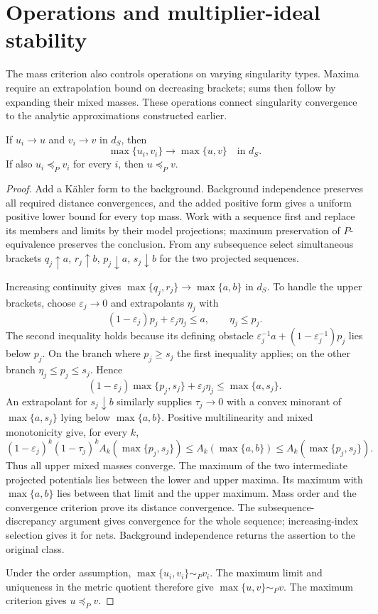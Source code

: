 \section{Operations and multiplier-ideal stability}
\label{sec:singularity-continuous-operations}
The mass criterion also controls operations on varying singularity types. Maxima require an extrapolation bound on decreasing brackets; sums then follow by expanding their mixed masses. These operations connect singularity convergence to the analytic approximations constructed earlier.

\begin{proposition}\label{prop:singularity-maximum-and-closed-order}
If $u_i\to u$ and $v_i\to v$ in $d_S$, then
\[
 \max\{u_i,v_i\}\longrightarrow\max\{u,v\}\quad\text{in }d_S.
\]
If also $u_i\preceq_P v_i$ for every $i$, then $u\preceq_P v$.
\end{proposition}
\begin{proof}
Add a K\"ahler form to the background. Background independence preserves all required distance convergences, and the added positive form gives a uniform positive lower bound for every top mass. Work with a sequence first and replace its members and limits by their model projections; maximum preservation of $P$-equivalence preserves the conclusion. From any subsequence select simultaneous brackets
$q_j\uparrow a$, $r_j\uparrow b$, $p_j\downarrow a$, $s_j\downarrow b$ for the two projected sequences.

Increasing continuity gives $\max\{q_j,r_j\}\to\max\{a,b\}$ in $d_S$. To handle the upper brackets, choose $\varepsilon_j\to0$ and extrapolants $\eta_j$ with
\[
 (1-\varepsilon_j)p_j+\varepsilon_j\eta_j\leq a,
                           \qquad\eta_j\leq p_j.
\]
The second inequality holds because its defining obstacle
$\varepsilon_j^{-1}a+(1-\varepsilon_j^{-1})p_j$ lies below $p_j$. On the branch where $p_j\geq s_j$ the first inequality applies; on the other branch $\eta_j\leq p_j\leq s_j$. Hence
\[
 (1-\varepsilon_j)\max\{p_j,s_j\}+\varepsilon_j\eta_j
                            \leq\max\{a,s_j\}.
\]
An extrapolant for $s_j\downarrow b$ similarly supplies $\tau_j\to0$ with a convex minorant of $\max\{a,s_j\}$ lying below $\max\{a,b\}$. Positive multilinearity and mixed monotonicity give, for every $k$,
\[
 (1-\varepsilon_j)^k(1-\tau_j)^k A_k(\max\{p_j,s_j\})
     \leq A_k(\max\{a,b\})
     \leq A_k(\max\{p_j,s_j\}).
\]
Thus all upper mixed masses converge. The maximum of the two intermediate projected potentials lies between the lower and upper maxima. Its maximum with $\max\{a,b\}$ lies between that limit and the upper maximum. Mass order and the convergence criterion prove its distance convergence. The subsequence-discrepancy argument gives convergence for the whole sequence; increasing-index selection gives it for nets. Background independence returns the assertion to the original class.

Under the order assumption, $\max\{u_i,v_i\}\sim_P v_i$. The maximum limit and uniqueness in the metric quotient therefore give $\max\{u,v\}\sim_P v$. The maximum criterion gives $u\preceq_P v$.
\end{proof}

